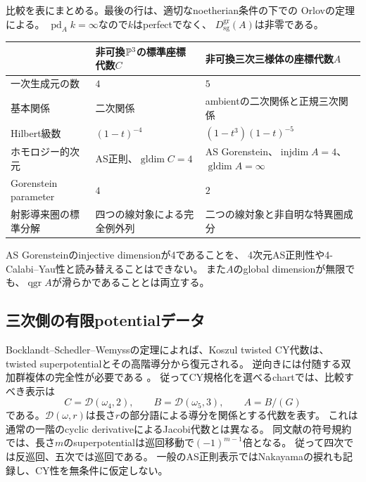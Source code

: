 比較を表にまとめる。最後の行は、適切なnoetherian条件の下での
Orlovの定理\cite[Theorem~2.5]{OrlovSingularities}による。
$\operatorname{pd}_A k=\infty$なので$k$はperfectでなく、
$D_{\mathrm{sg}}^{\mathrm{gr}}(A)$は非零である。
\begin{center}
\small
\begin{tabular}{p{}p{}p{}}
\hline
 & 非可換$\mathbb P^3$の標準座標代数$C$ & 非可換三次三様体の座標代数$A$\\
\hline
一次生成元の数 & $4$ & $5$\\
基本関係 & 二次関係 & ambientの二次関係と正規三次関係\\
Hilbert級数 & $(1-t)^{-4}$ & $(1-t^3)(1-t)^{-5}$\\
ホモロジー的次元 & AS正則、$\operatorname{gldim}C=4$ & AS Gorenstein、$\operatorname{injdim}A=4$、$\operatorname{gldim}A=\infty$\\
Gorenstein parameter & $4$ & $2$\\
射影導来圏の標準分解 & 四つの線対象による完全例外列 & 二つの線対象と非自明な特異圏成分\\
\hline
\end{tabular}
\end{center}
AS Gorensteinのinjective dimensionが4であることを、
4次元AS正則性や4-Calabi--Yau性と読み替えることはできない。
また$A$のglobal dimensionが無限でも、$\operatorname{qgr}A$が滑らかであることとは両立する。

\subsection{三次側の有限potentialデータ}

Bocklandt--Schedler--Wemyssの定理によれば、Koszul twisted CY代数は、
twisted superpotentialとその高階導分から復元される。
逆向きには付随する双加群複体の完全性が必要である
\cite[Theorem~6.2とその証明直後のtwisted版]{BSWPotentials}。
従ってCY規格化を選べるchartでは、比較すべき表示は
\begin{equation}\label{eq:cubic-p3-potential-degrees}
 C=\mathcal D(\omega_4,2),\qquad
 B=\mathcal D(\omega_5,3),\qquad A=B/(G)
\end{equation}
である。$\mathcal D(\omega,r)$は長さ$r$の部分語による導分を関係とする代数を表す。
これは通常の一階のcyclic derivativeによるJacobi代数とは異なる。
同文献の符号規約では、長さ$m$のsuperpotentialは巡回移動で$(-1)^{m-1}$倍となる。
従って四次では反巡回、五次では巡回である。
一般のAS正則表示ではNakayamaの捩れも記録し、CY性を無条件に仮定しない。

